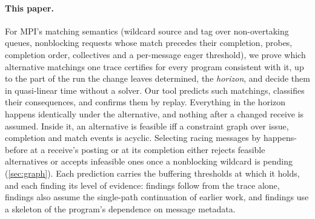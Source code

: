 \paragraph{This paper.} For MPI's matching semantics (wildcard source and tag over
non-overtaking queues, nonblocking requests whose match precedes their completion, probes,
completion order, collectives and a per-message eager threshold), we prove which
alternative matchings one trace certifies for every program consistent with it, up to the
part of the run the change leaves determined, the \emph{horizon}, and decide them in
quasi-linear time without a solver. Our tool \tool predicts such matchings, classifies their
consequences, and confirms them by replay. Everything in the horizon happens identically under
the alternative, and nothing after a changed receive is assumed. Inside it, an alternative is
feasible iff a constraint graph over issue, completion and match events is acyclic.
Selecting racing messages by happens-before at a receive's posting or at its completion
either rejects feasible alternatives or accepts infeasible ones once a nonblocking wildcard is
pending (\cref{sec:graph}). Each prediction carries the buffering thresholds at which it holds, and
each finding its level of evidence: \Lone findings follow from the trace alone, \LoneSP
findings also assume the single-path continuation of earlier work, and \Ltwo findings use a
skeleton of the program's dependence on message metadata.

